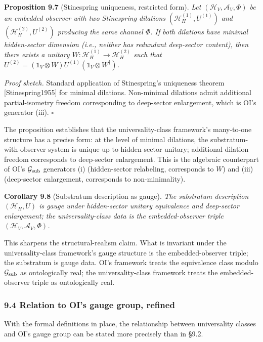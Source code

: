 \documentclass[
]{article}
\begin{document}
\textbf{Proposition 9.7} (Stinespring uniqueness, restricted form).
\emph{Let \((\mathcal{H}_V, \mathcal{A}_V, \Phi)\) be an embedded
observer with two Stinespring dilations
\((\mathcal{H}_H^{(1)}, U^{(1)})\) and
\((\mathcal{H}_H^{(2)}, U^{(2)})\) producing the same channel \(\Phi\).
If both dilations have minimal hidden-sector dimension (i.e., neither
has redundant deep-sector content), then there exists a unitary
\(W: \mathcal{H}_H^{(1)} \to \mathcal{H}_H^{(2)}\) such that
\(U^{(2)} = (\mathbb{1}_V \otimes W) U^{(1)} (\mathbb{1}_V \otimes W^\dagger)\).}

\emph{Proof sketch.} Standard application of Stinespring's uniqueness
theorem {[}Stinespring1955{]} for minimal dilations. Non-minimal
dilations admit additional partial-isometry freedom corresponding to
deep-sector enlargement, which is OI's generator (iii). \(\square\)

The proposition establishes that the universality-class framework's
many-to-one structure has a precise form: at the level of minimal
dilations, the substratum-with-observer system is unique up to
hidden-sector unitary; additional dilation freedom corresponds to
deep-sector enlargement. This is the algebraic counterpart of OI's
\(\mathcal{G}_{\rm sub}\) generators (i) (hidden-sector relabeling,
corresponds to \(W\)) and (iii) (deep-sector enlargement, corresponds to
non-minimality).

\textbf{Corollary 9.8} (Substratum description as gauge). \emph{The
substratum description \((\mathcal{H}_H, U)\) is gauge under
hidden-sector unitary equivalence and deep-sector enlargement; the
universality-class data is the embedded-observer triple
\((\mathcal{H}_V, \mathcal{A}_V, \Phi)\).}

This sharpens the structural-realism claim. What is invariant under the
universality-class framework's gauge structure is the embedded-observer
triple; the substratum is gauge data. OI's framework treats the
equivalence class modulo \(\mathcal{G}_{\rm sub}\) as ontologically
real; the universality-class framework treats the embedded-observer
triple as ontologically real.

\hypertarget{relation-to-ois-gauge-group-refined}{%
\subsubsection{9.4 Relation to OI's gauge group,
refined}\label{relation-to-ois-gauge-group-refined}}

With the formal definitions in place, the relationship between
universality classes and OI's gauge group can be stated more precisely
than in §9.2.
\end{document}
